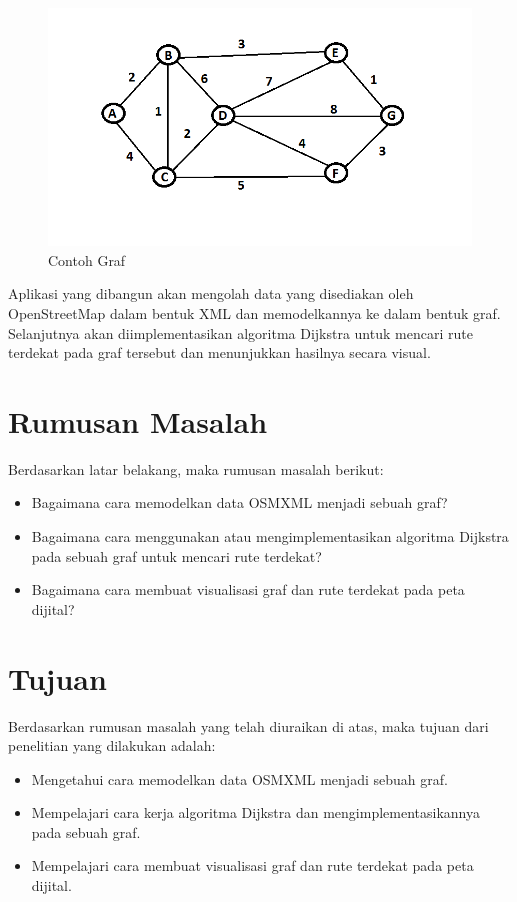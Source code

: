 \begin{figure}[h]
\centering
\includegraphics[scale=0.4]{Gambar/co_graf}
\caption[Contoh Graf]{Contoh Graf}
\label{fig:co_graf}
\end{figure}

Aplikasi yang dibangun akan mengolah data yang disediakan oleh OpenStreetMap
dalam bentuk XML dan memodelkannya ke dalam bentuk graf. Selanjutnya akan diimplementasikan algoritma
Dijkstra untuk mencari rute terdekat pada graf tersebut dan menunjukkan hasilnya secara visual.

\section{Rumusan Masalah}
Berdasarkan latar belakang, maka rumusan masalah berikut: 
\begin{itemize}
	\item Bagaimana cara memodelkan data OSMXML menjadi sebuah graf?
	\item Bagaimana cara menggunakan atau mengimplementasikan algoritma Dijkstra
	pada sebuah graf untuk mencari rute terdekat?
	\item Bagaimana cara membuat visualisasi graf dan rute terdekat pada peta
	dijital?
\end{itemize}

\section{Tujuan}
Berdasarkan rumusan masalah yang telah diuraikan di atas, maka tujuan dari penelitian yang dilakukan
adalah:
\begin{itemize} 
	\item Mengetahui cara memodelkan data OSMXML menjadi sebuah	graf.
	\item Mempelajari cara kerja algoritma Dijkstra dan	mengimplementasikannya pada
	sebuah graf.
 	\item Mempelajari cara membuat visualisasi graf dan rute terdekat pada peta
 	dijital.
 \end{itemize}

